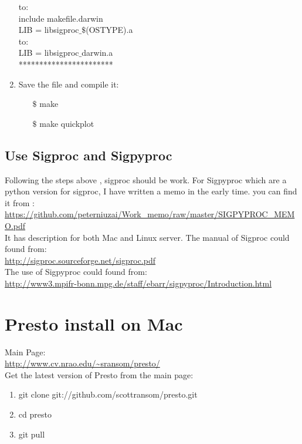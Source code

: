 \documentclass{article}
\begin{document}
\begin{enumerate}[1):]
	to:\\

	include makefile.darwin\\
	
	LIB = libsigproc$\_\$$(OSTYPE).a \\

	to:\\

	LIB = libsigproc$\_$darwin.a \\
***********************\\	
\item Save the file and compile it:
   \begin{enumerate}
 	 	\item[$\$$] make
 	 	\item[$\$$] make quickplot
   \end{enumerate}

\end{enumerate}

\subsection{Use Sigproc and Sigpyproc}
Following the steps above , sigproc should be work.  For Sigpyproc which are a python version for sigproc, I have written a memo in the early time. you can find it from :\\
\url{https://github.com/peterniuzai/Work_memo/raw/master/SIGPYPROC_MEMO.pdf}\\
It has description for both Mac and Linux server.
The manual of Sigproc could found from:\\
\url{http://sigproc.sourceforge.net/sigproc.pdf}\\
The use of Sigpyproc could found from:\\
\url{http://www3.mpifr-bonn.mpg.de/staff/ebarr/sigpyproc/Introduction.html}

\section{Presto install on Mac}
Main Page:\\
\url{http://www.cv.nrao.edu/~sransom/presto/}\\
Get the latest version of Presto from the main page:
\begin{enumerate}[1)]
\item git clone git://github.com/scottransom/presto.git
\item cd presto
\item git pull 
\end{enumerate}
\end{document}
